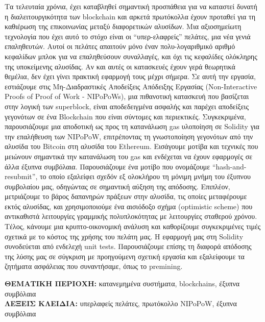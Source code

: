 Τα τελευταία χρόνια, έχει καταβληθεί σημαντική προσπάθεια για να καταστεί
δυνατή η διαλειτουργικότητα των blockchain και αρκετά πρωτόκολλα έχουν προταθεί
για τη καθιέρωση της επικοινωνίας μεταξύ διαφορετικών αλυσίδων. Μια
αξιοσημείωτη τεχνολογία που έχει αυτό το στόχο είναι οι “υπερ-ελαφρείς”
πελάτες, μια νέα γενιά επαληθευτών. Αυτοί οι πελάτες απαιτούν μόνο έναν
πολυ-λογαριθμικό αριθμό κεφαλίδων μπλοκ για να επαληθεύσουν συναλλαγές, και όχι
τις κεφαλίδες ολόκληρης της υποκείμενης αλυσίδας. Αν και αυτές οι κατασκευές
έχουν γερά θεωρητικά θεμέλια, δεν έχει γίνει πρακτική εφαρμογή τους μέχρι
σήμερα. Σε αυτή την εργασία, εστιάζουμε στις Μη-Διαδραστικές Αποδείξεις
Απόδειξης Εργασίας (Non-Interactive Proofs of Proof of Work - NIPoPoWs), μια
πιθανοτική κατασκευή που βασίζεται στην λογική των superblock, είναι
αποδεδειγμένα ασφαλής και παρέχει αποδείξεις γεγονότων σε ένα Blockchain που
είναι σύντομες και περιεκτικές. Συγκεκριμένα, παρουσιάζουμε μια αποδοτική ως
προς τη κατανάλωση gas υλοποίηση σε Solidity για την επαλήθευση των NIPoPoW,
επιτρέποντας τη γνωστοποίηση γεγονότων από την αλυσίδα του Bitcoin στη αλυσίδα
του Ethereum. Εισάγουμε μοτίβα και τεχνικές που μειώνουν σημαντικά την
κατανάλωση του gas και ενδέχεται να έχουν εφαρμογές σε άλλα έξυπνα συμβόλαια.
Παρουσιάζουμε ένα μοτίβο που ονομάζουμε ``hash-and-resubmit'', το οποίο εξαλείφει
σχεδόν εξ ολοκλήρου τη μόνιμη μνήμη του έξυπνου συμβολαίου μας, οδηγώντας σε
σημαντική αύξηση της απόδοσης. Επιπλέον, μετριάζουμε το βάρος δαπανηρών πράξεων
στην αλυσίδα, τις οποίες μεταφέρουμε εκτός αλυσίδας, και χρησιμοποιούμε ένα
αισιόδοξο σχήμα (optimistic scheme) που αντικαθιστά λειτουργίες γραμμικής
πολυπλοκότητας με λειτουργίες σταθερού χρόνου. Τέλος, κάνουμε μια
κρυπτο-οικονομική ανάλυση και καθορίζουμε συγκεκριμένες τιμές σχετικά με το
κόστος της χρήσης του πελάτη μας. Η εφαρμογή μας στη Solidity συνοδεύεται από
ενδελεχή unit tests. Παρουσιάζουμε επίσης τη διαφορά απόδοσης της λύσης μας σε
σύγκριση με προηγούμενη σχετική εργασία και εξαλείφουμε τα ζητήματα ασφάλειας
που συναντήσαμε, όπως το premining.

\vspace{6.5cm}
\noindent
\textbf{ΘΕΜΑΤΙΚΗ ΠΕΡΙΟΧΗ:} κατανεμημένα συστήματα, blockchains, έξυπνα
συμβόλαια\\
\textbf{ΛΕΞΕΙΣ ΚΛΕΙΔΙΑ:} υπερλαφείς πελάτες, πρωτόκολλο NIPoPoW, έξυπνα
συμβόλαια

